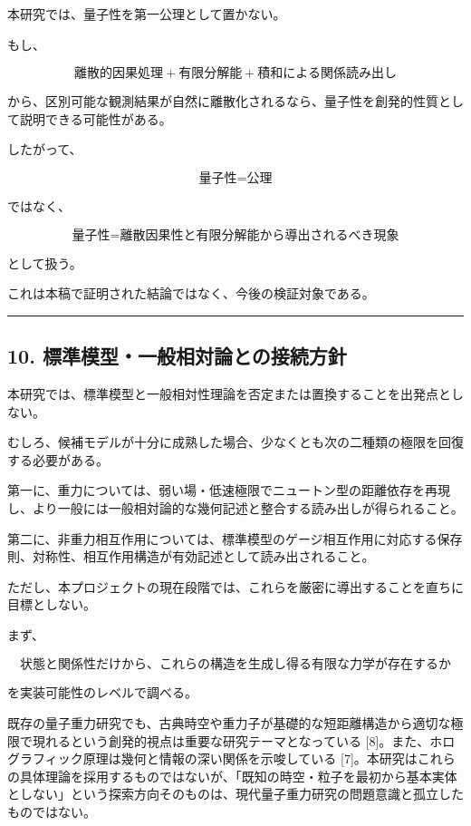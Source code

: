 \documentclass[
  a4paper,
]{ltjsarticle}
\begin{document}
本研究では、量子性を第一公理として置かない。

もし、

\[
\boxed{
\text{離散的因果処理}
+
\text{有限分解能}
+
\text{積和による関係読み出し}
}
\]

から、区別可能な観測結果が自然に離散化されるなら、量子性を創発的性質として説明できる可能性がある。

したがって、

\[
\boxed{
\text{量子性}
=
\text{公理}
}
\]

ではなく、

\[
\boxed{
\text{量子性}
=
\text{離散因果性と有限分解能から導出されるべき現象}
}
\]

として扱う。

これは本稿で証明された結論ではなく、今後の検証対象である。

\begin{center}\rule{0.5\linewidth}{0.5pt}\end{center}

\subsection{10.
標準模型・一般相対論との接続方針}\label{ux6a19ux6e96ux6a21ux578bux4e00ux822cux76f8ux5bfeux8ad6ux3068ux306eux63a5ux7d9aux65b9ux91dd}

本研究では、標準模型と一般相対性理論を否定または置換することを出発点としない。

むしろ、候補モデルが十分に成熟した場合、少なくとも次の二種類の極限を回復する必要がある。

第一に、重力については、弱い場・低速極限でニュートン型の距離依存を再現し、より一般には一般相対論的な幾何記述と整合する読み出しが得られること。

第二に、非重力相互作用については、標準模型のゲージ相互作用に対応する保存則、対称性、相互作用構造が有効記述として読み出されること。

ただし、本プロジェクトの現在段階では、これらを厳密に導出することを直ちに目標としない。

まず、

\[
\boxed{
\text{状態と関係性だけから、これらの構造を生成し得る有限な力学が存在するか}
}
\]

を実装可能性のレベルで調べる。

既存の量子重力研究でも、古典時空や重力子が基礎的な短距離構造から適切な極限で現れるという創発的視点は重要な研究テーマとなっている
{[}8{]}。また、ホログラフィック原理は幾何と情報の深い関係を示唆している
{[}7{]}。本研究はこれらの具体理論を採用するものではないが、「既知の時空・粒子を最初から基本実体としない」という探索方向そのものは、現代量子重力研究の問題意識と孤立したものではない。
\end{document}
